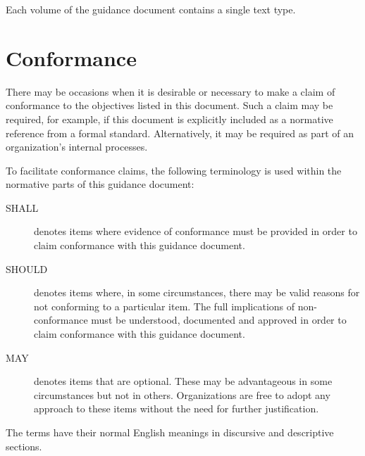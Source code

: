 Each volume of the guidance document contains a single text type.

\section{Conformance}
There may be occasions when it is desirable or necessary to make a claim of conformance to the objectives listed in this document. Such a claim may be required, for example, if this document is explicitly included as a normative reference from a formal standard. Alternatively, it may be required as part of an organization's internal processes.

To facilitate conformance claims, the following terminology is used within the normative parts of this guidance document:
\begin{description}
	\item[SHALL] denotes items where evidence of conformance must be provided in order to claim conformance with this guidance document.
	\item[SHOULD] denotes items where, in some circumstances, there may be valid reasons for not conforming to a particular item. The full implications of non-conformance must be understood, documented and approved in order to claim conformance with this guidance document.
	\item[MAY] denotes items that are optional. These may be advantageous in some circumstances but not in others. Organizations are free to adopt any approach to these items without the need for further justification.
\end{description}

The terms have their normal English meanings in discursive and descriptive sections.
